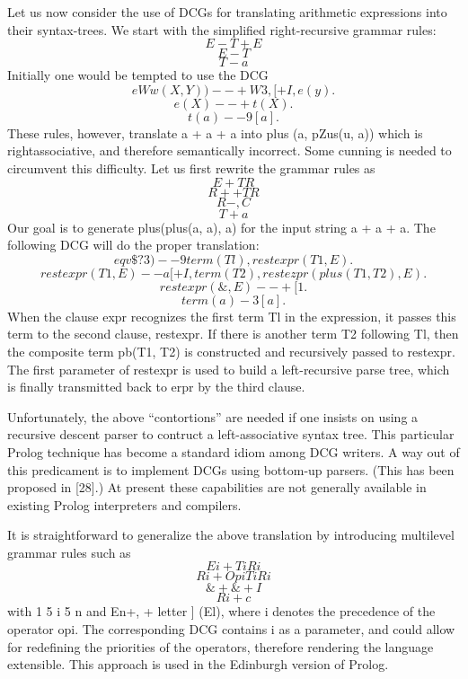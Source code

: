 Let us now consider the use of DCGs for translating arithmetic expressions
into their syntax-trees. We start with the simplified right-recursive grammar
rules:
\[E-T +E\]
\[E-T\]
\[T-a\]
Initially one would be tempted to use the DCG
\[eWw(X, Y)) --+ W3, [+I, e(y).\]
\[e(X) --+ t(X).\]
\[t(a) --9 [a].\]
These rules, however, translate a + a + a into plus (a, pZus(u, a)) which is rightassociative,
and therefore semantically incorrect. Some cunning is needed to 
circumvent this difficulty. Let us first rewrite the grammar rules as
\[E+TR\]
\[R++TR\]
\[R-,C\]
\[T+a\]
Our goal is to generate plus(plus(a, a), a) for the input string a + a + a. The
following DCG will do the proper translation:
\[eqv\$?3) --9 term(Tl), restexpr(T1, E).\]
\[restexpr(T1, E) --a [+I, term(T2), restezpr(plus(T1, T2), E).\]
\[restexpr(\&, E) --+ [ 1.\]
\[term(a) -3 [a].\]
When the clause expr recognizes the first term Tl in the expression, it passes
this term to the second clause, restexpr. If there is another term T2 following
Tl, then the composite term pb(T1, T2) is constructed and recursively passed
to restexpr. The first parameter of restexpr is used to build a left-recursive parse
tree, which is finally transmitted back to erpr by the third clause. 

Unfortunately, the above “contortions” are needed if one insists on using a
recursive descent parser to contruct a left-associative syntax tree. This particular
Prolog technique has become a standard idiom among DCG writers. A way out
of this predicament is to implement DCGs using bottom-up parsers. (This has
been proposed in [28].) At present these capabilities are not generally available
in existing Prolog interpreters and compilers. 

It is straightforward to generalize the above translation by introducing multilevel
grammar rules such as
\[Ei + TiRi\]
\[Ri + OpiTiRi\]
\[\& + \&+I\]
\[Ri + c\]
with 1 5 i 5 n and En+, + letter ] (El), where i denotes the precedence of the
operator opi. The corresponding DCG contains i as a parameter, and could allow
for redefining the priorities of the operators, therefore rendering the language
extensible. This approach is used in the Edinburgh version of Prolog.      

